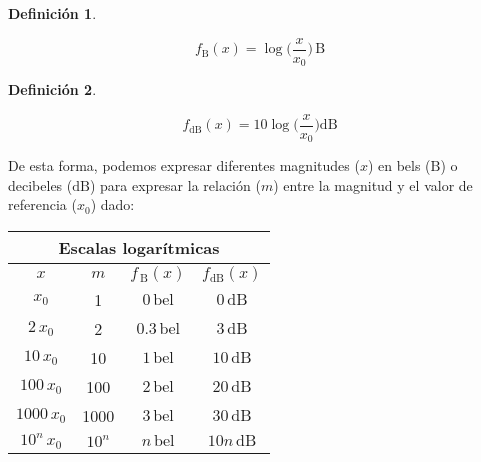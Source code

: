 \documentclass[a5paper,12pt,twoside]{book}
\newtheorem{defn}{{Definición}}[chapter]
\begin{document}
\begin{mdframed}[style=DefinitionFrame]
    \begin{defn}
    \end{defn}
    \begin{equation*}
        f_{\si{\bel}}(x)=\log \Big( \frac{x}{x_0} \Big) \, \si{\bel}
    \end{equation*}
\end{mdframed}

\begin{mdframed}[style=DefinitionFrame]
    \begin{defn}
    \end{defn}
    \begin{equation*}
        f_{\si{\deci\bel}}(x) = 10 \log \Big( \frac{x}{x_0} \Big) \si{\deci\bel}
    \end{equation*}
\end{mdframed}

De esta forma, podemos expresar diferentes magnitudes ($x$) en bels ($\si{\bel}$) o decibeles ($\si{\deci\bel}$) para expresar la relación ($m$) entre la magnitud y el valor de referencia ($x_0$) dado:

\begin{center}
    \begin{tabular}{|c|c|c|c|}
        \hline 
        \multicolumn{4}{|c|}{Escalas logarítmicas} \\ \hline \hline
        $x$ & $m$ & $f_{\, \si{\bel}}(x)$ & $f_{\si{\deci\bel}}(x)$ \\
        \hline \hline
        $x_0$ & 1 & $0 \, \mathrm{bel}$ & $0 \, \si{\deci\bel}$ \\ \hline
        $2 \, x_0$ & 2 & $0.3 \, \mathrm{bel}$ & $3 \, \si{\deci\bel}$ \\ \hline
        $10 \, x_0$ & 10 & $1 \, \mathrm{bel}$ & $10 \, \si{\deci\bel}$ \\ \hline
        $100 \, x_0$ & 100 & $2 \, \mathrm{bel}$ & $20 \, \si{\deci\bel}$ \\ \hline
        $1000 \, x_0$ & 1000 & $3 \, \mathrm{bel}$ & $30 \, \si{\deci\bel}$ \\ \hline
        $10^n \, x_0$ & $10^n$ & $n \, \mathrm{bel}$ & $10 n \, \si{\deci\bel}$ \\ \hline
    \end{tabular}
\end{center}
\end{document}
